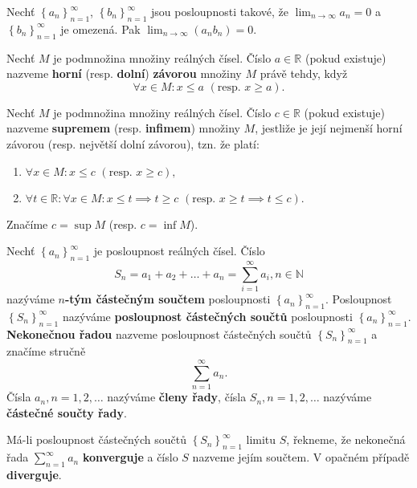 \begin{veta}
    Nechť $\left \{ a_n \right \}_{n=1}^\infty $, $\left \{ b_n \right \}_{n=1}^\infty $
    jsou posloupnosti takové, že $\lim_{n\to\infty}a_n=0$ a $\left \{ b_n \right \}_{n=1}^\infty $
    je omezená. Pak $\lim_{n\to\infty}\left ( a_nb_n \right ) =0.$
\end{veta}

\begin{definition}
Nechť $M$ je podmnožina množiny reálných čísel. Číslo $a\in \mathbb R$ (pokud existuje)
nazveme \textbf{horní} (resp. \textbf{dolní}) \textbf{závorou} množiny $M$ právě tehdy,
když
$$\forall x \in M:x\leq a \,\, (\textrm{resp. }x\geq a).$$
\end{definition}

\begin{definition}\label{supinf}
Nechť $M$ je podmnožina množiny reálných čísel. Číslo $c\in \mathbb R$ (pokud existuje)
nazveme \textbf{supremem} (resp. \textbf{infimem}) množiny $M$, jestliže je její
nejmenší horní závorou (resp. největší dolní závorou), tzn. že platí:
\begin{enumerate}[$i.$]
\item $\forall x\in M:x\leq c \,\, (\textrm{resp. } x\geq c),$
\item $\forall t\in \mathbb R: \forall x\in  M:x\leq t \implies t\geq c \,\, (\textrm{resp. }x\geq t \implies t\leq c).$
\end{enumerate}
Značíme $c=\sup M$ (resp. $c=\inf M$).
\end{definition}

\begin{definition}
Nechť $\left \{ a_n \right \}_{n=1}^\infty $ je posloupnost reálných čísel. Číslo
$$S_n=a_1+a_2+\dots+a_n = \sum_{i=1}^\infty a_i, n\in \mathbb N$$
nazýváme \textbf{$n$-tým částečným součtem} posloupnosti $\left \{ a_n \right \}_{n=1}^\infty $.
Posloupnost $\left \{ S_n \right \}_{n=1}^\infty $ nazýváme \textbf{posloupnost
částečných součtů} posloupnosti $\left \{ a_n \right \}_{n=1}^\infty $.\\
\textbf{Nekonečnou řadou} nazveme posloupnost částečných součtů
$\left \{ S_n \right \}_{n=1}^\infty $ a značíme stručně
$$\sum_{n=1}^\infty a_n.$$
Čísla $a_n, n=1,2,\dots$ nazýváme \textbf{členy řady}, čísla $S_n, n=1,2,\dots$
nazýváme \textbf{částečné součty řady}.
\end{definition}

\begin{definition}
Má-li posloupnost částečných součtů $\left \{ S_n \right \}_{n=1}^\infty $
limitu $S$, řekneme, že nekonečná řada $\sum_{n=1}^\infty a_n$ \textbf{konverguje}
a číslo $S$ nazveme jejím součtem. V opačném případě \textbf{diverguje}.
\end{definition}

